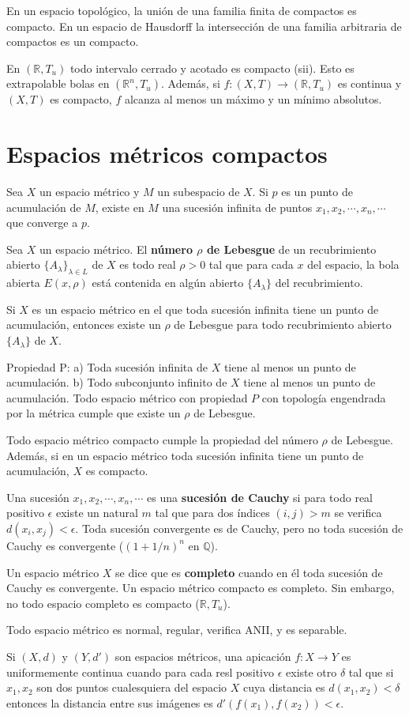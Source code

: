 \documentclass[a4paper, 11pt]{extarticle}
\begin{document}
En un espacio topológico, la unión de una familia finita de compactos es
compacto. En un espacio de Hausdorff la intersección de una familia arbitraria
de compactos es un compacto.

En \(( \mathbb{R}, T_u)\) todo intervalo cerrado y acotado es compacto (sii).
Esto es extrapolable  bolas en \((\mathbb{R}^n, T_u)\). Además, si \(f:(X,T)
\rightarrow (\mathbb{R}, T_u)\) es continua y \((X,T)\) es compacto, \(f\)
alcanza al menos un máximo y un mínimo absolutos.

\section{Espacios métricos compactos}
\label{sec:org7f2e8d3}
Sea \(X\) un espacio métrico y \(M\) un subespacio de \(X\). Si \(p\)
es un punto de acumulación de \(M\), existe en \(M\) una sucesión infinita
de puntos \(x_1, x_2, \cdots, x_n, \cdots\) que converge a \(p\).

Sea \(X\) un espacio métrico. El \textbf{número \(\rho\) de Lebesgue} de un
recubrimiento abierto \(\{ A_\lambda \}_{\lambda \in L}\) de \(X\) es todo
real \(\rho > 0\) tal que para cada \(x\) del espacio, la bola abierta \(E(x,\rho)\) está contenida en algún abierto \(\{ A_\lambda \}\) del
recubrimiento. 

Si \(X\) es un espacio métrico en el que toda sucesión infinita tiene un punto
de acumulación, entonces existe un \(\rho\) de Lebesgue para todo
recubrimiento abierto \(\{ A_\lambda \}\) de \(X\). 

Propiedad P: a) Toda sucesión infinita de \(X\) tiene al menos un punto de
acumulación. b) Todo subconjunto infinito de \(X\) tiene al menos un punto de
acumulación. Todo espacio métrico con propiedad \(P\) con topología engendrada
por la métrica cumple  que existe un \(\rho\) de Lebesgue. 

Todo espacio métrico compacto cumple la propiedad del número \(\rho\) de
Lebesgue. Además, si en un espacio métrico toda sucesión infinita tiene un punto
de acumulación, \(X\) es compacto.

Una sucesión \(x_1, x_2, \cdots, x_n, \cdots\) es una \textbf{sucesión de Cauchy} si
para todo real positivo \(\epsilon\) existe un natural \(m\) tal que para
dos índices \((i,j) > m\) se verifica \(d(x_i, x_j) < \epsilon\). Toda
sucesión convergente es de Cauchy, pero no toda sucesión de Cauchy es
convergente (\((1 + 1/n)^n\) en \(\mathbb{Q}\)).

Un espacio métrico \(X\) se dice que es \textbf{completo} cuando en él toda sucesión de
Cauchy es convergente. Un espacio métrico compacto es completo. Sin embargo, no
todo espacio completo es compacto (\(\mathbb{R}, T_u\)).

Todo espacio métrico es normal, regular, verifica ANII, y es separable.

Si \((X,d)\) y \((Y, d')\) son espacios métricos, una apicación \(f: X
\rightarrow Y\) es uniformemente continua cuando para cada resl positivo \(\epsilon\) existe otro \(\delta\) tal que si \(x_1, x_2\) son dos puntos
cualesquiera del espacio \(X\) cuya distancia es \(d(x_1,x_2) < \delta\)
entonces la distancia entre sus imágenes es \(d'(f(x_1), f(x_2)) < \epsilon\).
\end{document}

